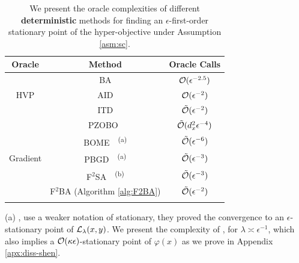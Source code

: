 \documentclass[twoside,11pt]{article}
\begin{document}
\begin{table}[t]
    \centering
    \caption{
    We present the oracle complexities of different \textbf{deterministic} methods for finding an $\epsilon$-first-order stationary point of the hyper-objective under Assumption \ref{asm:sc}.}
    \label{tab:res-1st}
    \begin{tabular}{c c c}
    \hline 
    Oracle     & Method   & Oracle Calls    \\
    \hline 
    \addlinespace
         & BA \citep{ghadimi2018approximation}  & ${\mathcal{O}}( \epsilon^{-2.5} )$ 
    \\
     \addlinespace
    HVP & AID \citep{ji2021bilevel}  & ${\mathcal{O}} ( \epsilon^{-2}   )$  \\
    \addlinespace
    & ITD \citep{ji2021bilevel}  & $ \tilde {{\mathcal{O}}} ( \epsilon^{-2} )$  \\
    \addlinespace
    \hline
    \addlinespace
    & PZOBO~\citep{sow2022convergence}  & $\tilde {{\mathcal{O}}}( d_{x}^2\epsilon^{-4} )$
    \\
    \addlinespace
    & BOME~\citep{liu2022bome}~\textsuperscript{{\color{blue}(a)}}  &$ \tilde {{\mathcal{O}}}(  \epsilon^{-6} )$   \\ \addlinespace
    Gradient & PBGD~\citep{shen2023penalty}~\textsuperscript{{\color{blue}(a)}}  & $ \tilde {{\mathcal{O}}}(  \epsilon^{-3} )$ \\ \addlinespace
    & F${}^2$SA~\citep{kwon2023fully}~\textsuperscript{{\color{blue}(b)}}  &$ \tilde {{\mathcal{O}}}(  \epsilon^{-3} )$  \\ 
    \addlinespace
     & 
F${}^2$BA (Algorithm \ref{alg:F2BA}) & $ \tilde {{\mathcal{O}}}( \epsilon^{-2})$  \\ 
     \addlinespace
     \hline
    \end{tabular}
    \begin{tablenotes}
		{\scriptsize   
  \item {\color{blue} (a)} {\citet{shen2023penalty}, \citet{liu2022bome} use a weaker notation of stationary, they proved the convergence to an $\epsilon$-stationary point of ${\mathcal{L}}_{\lambda}(x,y)$. We present the complexity of \citet{shen2023penalty}, \citet{liu2022bome} for $\lambda \asymp \epsilon^{-1}$, which also implies a ${\mathcal{O}}(\kappa \epsilon)$-stationary point of $\varphi(x)$ as we prove in Appendix \ref{apx:diss-shen}.}
}
\end{tablenotes}
\end{table}
\end{document}
